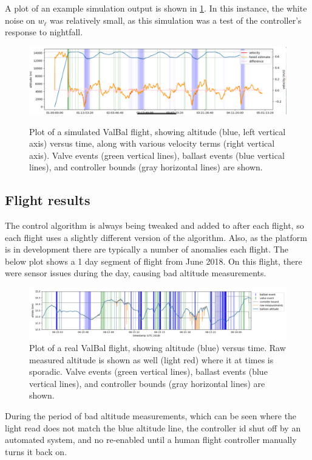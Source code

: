 \documentclass[11pt]{scrartcl} %
\begin{document}
A plot of an example simulation output is shown in \ref{lsim}. In this instance, the white noise on $w_{\dot \ell}$ was relatively small, as this simulation was a test of the controller's response to nightfall.
\begin{figure}[h]
\includegraphics[width=1\linewidth]{lsim.png}
\label{lsim}
\caption{Plot of a simulated ValBal flight, showing altitude (blue, left vertical axis) versus time, along with various velocity terms (right vertical axis). Valve events (green vertical lines), ballast events (blue vertical lines), and controller bounds (gray horizontal lines) are shown.}
\end{figure}

\subsection{Flight results}

The control algorithm is always being tweaked and added to after each flight, so each flight uses a slightly different version of the algorithm. Also, as the platform is in development there are typically a number of anomalies each flight. The below plot shows a 1 day segment of flight from June 2018. On this flight, there were sensor issues during the day, causing bad altitude measurements.

\begin{figure}[h]
\includegraphics[width=1\linewidth]{../../figs/flightperf/fig.png}
\caption{Plot of a real ValBal flight, showing altitude (blue) versus time. Raw measured altitude is shown as well (light red) where it at times is sporadic. Valve events (green vertical lines), ballast events (blue vertical lines), and controller bounds (gray horizontal lines) are shown.}
\label{rea}
\end{figure}

During the period of bad altitude measurements, which can be seen where the light read does not match the blue altitude line, the controller id shut off by an automated system, and no re-enabled until a human flight controller manually turns it back on.
\end{document}
